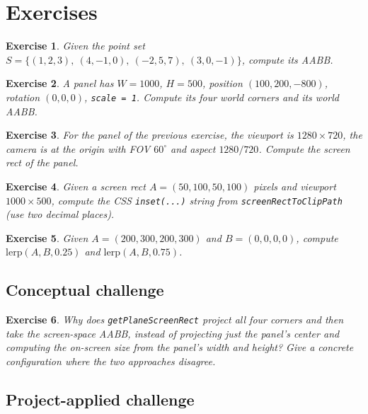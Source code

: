 \documentclass{article}
\newtheorem{exercise}{Exercise}
\begin{document}
\section{Exercises}

\begin{exercise}
Given the point set
$S = \{(1, 2, 3),\ (4, -1, 0),\ (-2, 5, 7),\ (3, 0, -1)\}$,
compute its AABB.
\end{exercise}

\begin{exercise}
A panel has $W = 1000$, $H = 500$, position $(100, 200, -800)$, rotation $(0, 0, 0)$,
\texttt{scale = 1}. Compute its four world corners and its world AABB.
\end{exercise}

\begin{exercise}
For the panel of the previous exercise, the viewport is $1280 \times 720$, the camera is
at the origin with FOV $60^\circ$ and aspect $1280/720$. Compute the screen rect of the
panel.
\end{exercise}

\begin{exercise}
Given a screen rect $A = (50, 100, 50, 100)$ pixels and viewport $1000 \times 500$,
compute the CSS \texttt{inset(...)} string from \texttt{screenRectToClipPath} (use two
decimal places).
\end{exercise}

\begin{exercise}
Given $A = (200, 300, 200, 300)$ and $B = (0, 0, 0, 0)$, compute
$\mathrm{lerp}(A, B, 0.25)$ and $\mathrm{lerp}(A, B, 0.75)$.
\end{exercise}

\subsection*{Conceptual challenge}

\begin{exercise}
Why does \texttt{getPlaneScreenRect} project all four corners and then take the
screen-space AABB, instead of projecting just the panel's center and computing the
on-screen size from the panel's width and height? Give a concrete configuration where
the two approaches disagree.
\end{exercise}

\subsection*{Project-applied challenge}
\end{document}
